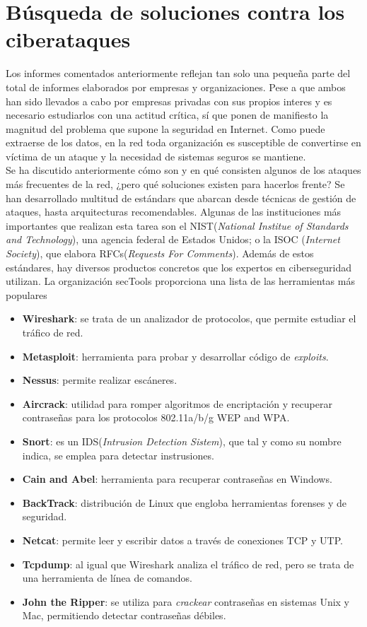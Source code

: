 \section{Búsqueda de soluciones contra los ciberataques}
Los informes comentados anteriormente reflejan tan solo una pequeña parte del total de informes elaborados por empresas y organizaciones. Pese a que ambos han sido llevados a cabo por empresas privadas con sus propios interes y es necesario estudiarlos con una actitud crítica, sí que ponen de manifiesto la magnitud del problema que supone la seguridad en Internet. Como puede extraerse de los datos, en la red toda organización es susceptible de convertirse en víctima de un ataque y la necesidad de sistemas seguros se mantiene.\\ 
Se ha discutido anteriormente cómo son y en qué consisten algunos de los ataques más frecuentes de la red, ¿pero qué soluciones existen para hacerlos frente? Se han desarrollado multitud de estándars que abarcan desde técnicas de gestión de ataques, hasta arquitecturas recomendables. Algunas de las instituciones más importantes que realizan esta tarea son el NIST(\textit{National Institue of Standards and Technology}), una agencia federal de Estados Unidos; o la ISOC (\textit{Internet Society}), que elabora RFCs(\textit{Requests For Comments})\cite{Stallings2016}. Además de estos estándares, hay diversos productos concretos que los expertos en ciberseguridad utilizan. La organización secTools proporciona una lista de las herramientas más populares\cite{secTools}
\begin{itemize}
	\item \textbf{Wireshark}: se trata de un analizador de protocolos, que permite estudiar el tráfico de red.
	\item \textbf{Metasploit}: herramienta para probar y desarrollar código de \textit{exploits}.
	\item \textbf{Nessus}: permite realizar escáneres.
	\item \textbf{Aircrack}: utilidad para romper algoritmos de encriptación y recuperar contraseñas para los protocolos 802.11a/b/g WEP and WPA.
	\item \textbf{Snort}: es un IDS(\textit{Intrusion Detection Sistem}), que tal y como su nombre indica, se emplea para detectar instrusiones.
	\item \textbf{Cain and Abel}: herramienta para recuperar contraseñas en Windows.
	\item \textbf{BackTrack}: distribución de Linux que engloba herramientas forenses y de seguridad.
	\item \textbf{Netcat}: permite leer y escribir datos a través de conexiones TCP y UTP.
	\item \textbf{Tcpdump}: al igual que Wireshark analiza el tráfico de red, pero se trata de una herramienta de línea de comandos.
	\item \textbf{John the Ripper}: se utiliza para \textit{crackear} contraseñas en sistemas Unix y Mac, permitiendo detectar contraseñas débiles.
\end{itemize}
